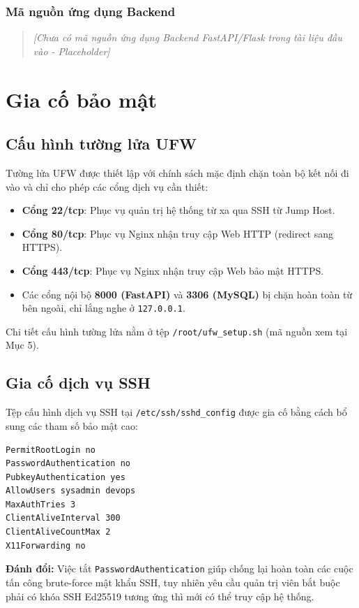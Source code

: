 \documentclass[a4paper,12pt]{article}
\newenvironment{noteblock}
  {\begin{quote}\itshape}
  {\end{quote}}
\begin{document}
\subsubsection{Mã nguồn ứng dụng Backend}
\begin{noteblock}
[Chưa có mã nguồn ứng dụng Backend FastAPI/Flask trong tài liệu đầu vào - Placeholder]
\end{noteblock}

\newpage
\section{Gia cố bảo mật}

\subsection{Cấu hình tường lửa UFW}
Tường lửa UFW được thiết lập với chính sách mặc định chặn toàn bộ kết nối đi vào và chỉ cho phép các cổng dịch vụ cần thiết:
\begin{itemize}
    \item \textbf{Cổng 22/tcp}: Phục vụ quản trị hệ thống từ xa qua SSH từ Jump Host.
    \item \textbf{Cổng 80/tcp}: Phục vụ Nginx nhận truy cập Web HTTP (redirect sang HTTPS).
    \item \textbf{Cổng 443/tcp}: Phục vụ Nginx nhận truy cập Web bảo mật HTTPS.
    \item Các cổng nội bộ \textbf{8000 (FastAPI)} và \textbf{3306 (MySQL)} bị chặn hoàn toàn từ bên ngoài, chỉ lắng nghe ở \texttt{127.0.0.1}.
\end{itemize}

Chi tiết cấu hình tường lửa nằm ở tệp \texttt{/root/ufw\_setup.sh} (mã nguồn xem tại Mục 5).

\subsection{Gia cố dịch vụ SSH}
Tệp cấu hình dịch vụ SSH tại \texttt{/etc/ssh/sshd\_config} được gia cố bằng cách bổ sung các tham số bảo mật cao:
\begin{lstlisting}
PermitRootLogin no
PasswordAuthentication no
PubkeyAuthentication yes
AllowUsers sysadmin devops
MaxAuthTries 3
ClientAliveInterval 300
ClientAliveCountMax 2
X11Forwarding no
\end{lstlisting}
\textbf{Đánh đổi:} Việc tắt \texttt{PasswordAuthentication} giúp chống lại hoàn toàn các cuộc tấn công brute-force mật khẩu SSH, tuy nhiên yêu cầu quản trị viên bắt buộc phải có khóa SSH Ed25519 tương ứng thì mới có thể truy cập hệ thống.
\end{document}
